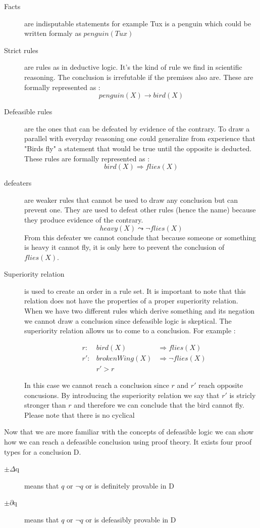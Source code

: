 \documentclass[10pt]{report}
\begin{document}
\begin{description}
\item[Facts] are indisputable statements for example Tux is a penguin which could be written formaly as $penguin(Tux)$
\item[Strict rules] are rules as in deductive logic. It's the kind of rule we find in scientific reasoning. The conclusion is irrefutable if the premises also are. These are formally represented as : 
$$penguin(X) \rightarrow bird(X)$$
\item[Defeasible rules] are the ones that can be defeated by evidence of the contrary. To draw a parallel with everyday reasoning one could generalize from experience that "Birds fly" a statement that would be true until the opposite is deducted. These rules are formally represented as :
$$bird(X) \Rightarrow flies(X)$$
\item[defeaters] are weaker rules that cannot be used to draw any conclusion but can prevent one. They are used to defeat other rules (hence the name) because they produce evidence of the contrary. 
$$heavy(X) \leadsto \neg flies(X)$$
From this defeater we cannot conclude that because someone or something is heavy it cannot fly, it is only here to prevent the conclusion of $flies(X)$.
\item[Superiority relation] is used to create an order in a rule set. It is important to note that this relation does not have the properties of a proper superiority relation. When we have two different rules which derive something and its negation we cannot draw a conclusion since defeasible logic is skeptical. The superiority relation allows us to come to a conclusion. For example :

\[
\begin{aligned}
& r :&      bird(X) &\Rightarrow flies(X)\\
& r':&brokenWing(X) &\Rightarrow \neg flies(X)\\
& & r'>r
\end{aligned}
\]

In this case we cannot reach a conclusion since $r$ and $r'$ reach opposite concusions. By introducing the superiority relation we say that $r'$ is stricly stronger than $r$ and therefore we can conclude that the bird cannot fly. Please note that there is no cyclical 
\end{description}

Now that we are more familiar with the concepts of defeasible logic we can show how we can reach a defeasible conclusion using proof theory. It exists four proof types for a conclusion D.
\begin{description}
\item[$\pm\Delta$q] means that $q$ or $\neg q$ or is definitely provable in D
\item[$\pm\partial$q] means that $q$ or $\neg q$ or is defeasibly provable in D
\end{description}
\end{document}
